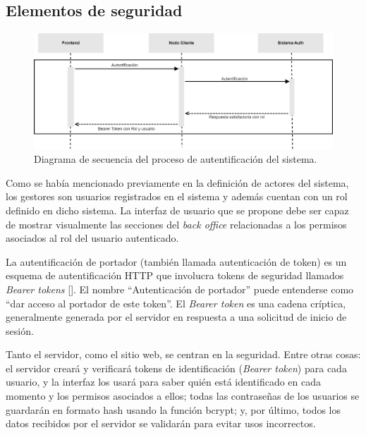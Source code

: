 \subsection{Elementos de seguridad}
\begin{figure}[!h]
\centering
\includegraphics[width=\textwidth]{Graphics/authtt}
\caption{Diagrama de secuencia del proceso de autentificación del sistema.}
\label{fig:autht}
\end{figure}
Como se había mencionado previamente en la definición de actores del sistema, los gestores son usuarios registrados en el sistema y además cuentan con un rol definido en dicho sistema. La interfaz de usuario que se propone debe ser capaz de mostrar visualmente las secciones del \textit{back office} relacionadas a los permisos asociados al rol del usuario autenticado.


La autentificación de portador (también llamada autenticación de token) es un esquema de autentificación HTTP que involucra tokens de seguridad llamados \textit{Bearer tokens} [\cite{98}]. El nombre ``Autenticación de portador'' puede entenderse como ``dar acceso al portador de este token''. El \textit{Bearer token} es una cadena críptica, generalmente generada por el servidor en respuesta a una solicitud de inicio de sesión.

Tanto el servidor, como el sitio web, se centran en la seguridad. Entre otras cosas: el servidor creará y verificará tokens de identificación (\textit{Bearer token}) para cada usuario, y la interfaz los usará para saber quién está identificado en cada momento y los permisos asociados a ellos; todas las contraseñas de los usuarios se guardarán en formato hash usando la función bcrypt; y, por último, todos los datos recibidos por el servidor se validarán para evitar usos incorrectos.

